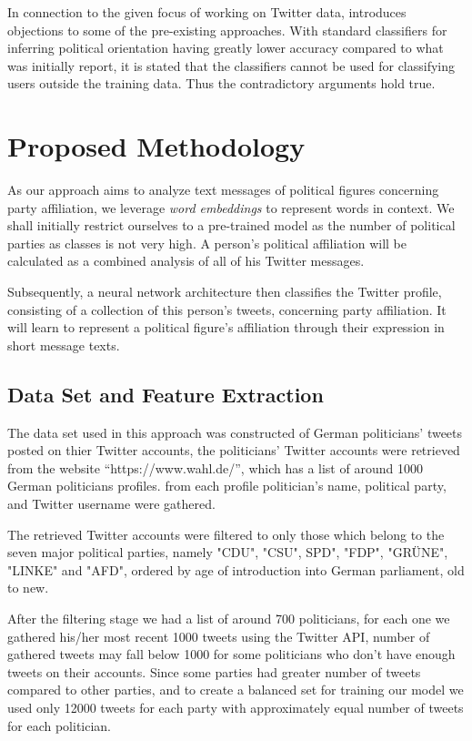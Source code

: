 \documentclass[10pt, oneside]{article}
\begin{document}
\begin{multicols}{2}
In connection to the given focus of working on Twitter data, \cite{Cohen2013} introduces objections to some of the pre-existing approaches. With standard classifiers for inferring political orientation having greatly lower accuracy compared to what was initially report, it is stated that the classifiers cannot be used for classifying users outside the training data. Thus the contradictory arguments hold true.


\section{Proposed Methodology}

As our approach aims to analyze text messages of political figures concerning party affiliation, we leverage \textit{word embeddings} to represent words in context. We shall initially restrict ourselves to a pre-trained model as the number of political parties as classes is not very high. A person's political affiliation will be calculated as a combined analysis of all of his Twitter messages.

Subsequently, a neural network architecture then classifies the Twitter profile, consisting of a collection of this person's tweets, concerning party affiliation. It will learn to represent a political figure's affiliation through their expression in short message texts.

\subsection{Data Set and Feature Extraction} 

The data set used in this approach was constructed of German politicians' tweets posted on thier Twitter accounts, the politicians' Twitter accounts were retrieved from the website “https://www.wahl.de/”, which has a list of around 1000 German politicians profiles. from each profile politician’s name, political party, and Twitter username were gathered.
 
The retrieved Twitter accounts were filtered to only those which belong to the seven major political parties, namely "CDU", "CSU", SPD", "FDP", "GRÜNE", "LINKE" and "AFD", ordered by age of introduction into German parliament, old to new. 

After the filtering stage we had  a list of around 700 politicians, for each one we gathered his/her most recent 1000 tweets using the Twitter API, number of gathered tweets may fall below 1000 for some politicians who don’t have enough tweets on their accounts. Since some parties had greater number of tweets compared to other parties, and  to create a balanced set for training our model we used only 12000 tweets for each party with approximately equal number of tweets for each politician.    


\end{multicols}
\end{document}
